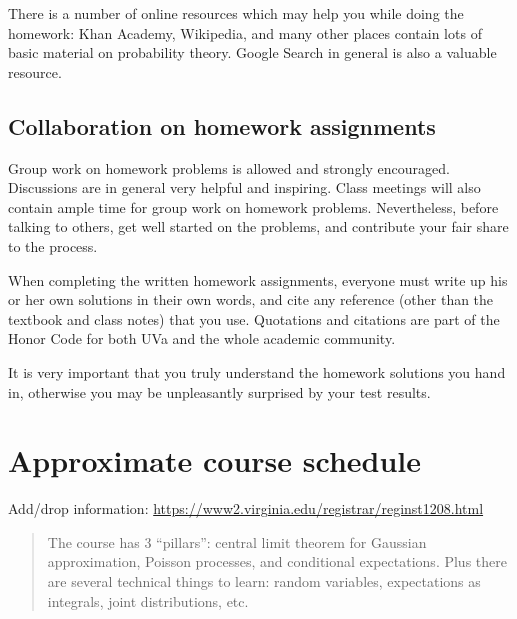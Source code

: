 \documentclass[oneside,11pt]{amsart}
\begin{document}
There is a number of online resources which may help you while doing the homework:
Khan Academy, Wikipedia, and many other 
places contain lots of basic material on probability theory. Google Search
in general
is also a valuable resource.

\subsection{Collaboration on homework assignments}
\label{collaboration}

Group work on homework problems is allowed and strongly encouraged.
Discussions are in general very
helpful and inspiring. Class meetings will also contain ample time
for group work on homework problems.
Nevertheless, before talking to others, get well started
on the problems, and contribute your fair share to the process. 

When completing the written homework assignments, everyone must write up his or her own
solutions in their own words, and cite any reference 
(other than the textbook and
class notes) that you use. Quotations and citations are part of the Honor Code for both UVa
and the whole academic community. 

It is very important that you truly understand the homework solutions you hand
in, otherwise you may be unpleasantly surprised by your test results.

\section{Approximate course schedule}

\noindent Add/drop information: \url{https://www2.virginia.edu/registrar/reginst1208.html}
\bigskip

\begin{quote}
	The course has 3 ``pillars'': central limit theorem for Gaussian approximation, 
	Poisson processes, and conditional expectations. 
	Plus there are several technical things to learn: random variables, expectations as integrals, 
	joint distributions, etc.
\end{quote}

\bigskip
\end{document}
